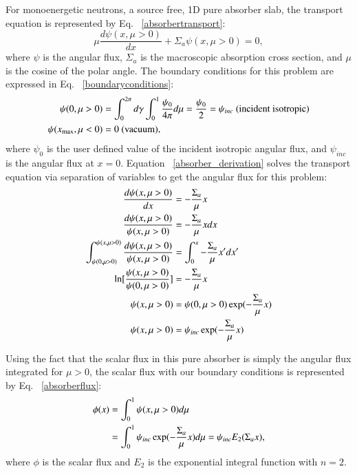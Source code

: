 \documentclass{anstrans}
\begin{document}
For monoenergetic neutrons, a source free, 1D pure absorber slab, the transport equation is represented by Eq. ~\eqref{absorbertransport}:
\begin{equation}
\mu \frac{d\psi (x,\mu>0)}{dx} + \Sigma_a \psi(x,\mu>0) = 0,
\label{absorbertransport}
\end{equation}
where $\psi$ is the angular flux, $\Sigma_a$ is the macroscopic absorption cross section, and $\mu$ is the cosine of the polar angle. The boundary conditions for this problem are expressed in Eq. ~\eqref{boundaryconditions}:
\begin{align}
\label{boundaryconditions}
\psi(0,\mu>0) &= \int_{0}^{2\pi}d\gamma \int_{0}^{1}\frac{\psi_{0}}{4\pi} d\mu = \frac{\psi_{0}}{2}  = \psi_{inc} \text{ (incident isotropic)} \notag \\
\psi(x_{\text{max}},\mu<0) &= 0 \text{ (vacuum)},
\end{align}
where $\psi_{0}$ is the user defined value of the incident isotropic angular flux, and $\psi_{inc}$ is the angular flux at $x = 0$. Equation ~\eqref{absorber_derivation} solves the transport equation via separation of variables to get the angular flux for this problem:
\begin{align}
\label{absorber_derivation}
\frac{d\psi(x,\mu>0)}{dx} &= -\frac{\Sigma_a}{\mu} x \notag \\
\frac{d\psi(x,\mu>0)}{\psi(x,\mu>0)} &= -\frac{\Sigma_a}{\mu} x dx \notag \\
\int_{\psi(0,\mu>0)}^{\psi(x,\mu>0)}\frac{d\psi(x,\mu>0)}{\psi(x,\mu>0)} &= \int_{0}^{x}-\frac{\Sigma_a}{\mu} x' dx' \notag \\
\ln[\frac{\psi(x,\mu>0)}{\psi(0,\mu>0)}] &= -\frac{\Sigma_a}{\mu} x \notag \\
\psi(x,\mu>0) & = \psi(0,\mu>0)\exp(-\frac{\Sigma_a}{\mu} x) \notag \\
\psi(x,\mu>0) & = \psi_{inc}\exp(-\frac{\Sigma_a}{\mu} x) 
\end{align}

Using the fact that the scalar flux in this pure absorber is simply the angular flux integrated for $\mu > 0$, the scalar flux with our boundary conditions is represented by Eq. ~\eqref{absorberflux}:
\begin{align}
\phi(x) &= \int_{0}^{1}\psi(x,\mu>0) d\mu \notag \\
&= \int_{0}^{1}\psi_{inc}\exp(-\frac{\Sigma_a}{\mu} x) d\mu = \psi_{inc} E_{2}(\Sigma_a x),
\label{absorberflux}
\end{align}
where $\phi$ is the scalar flux and $E_2$ is the exponential integral function with $n=2$. 
\end{document}
